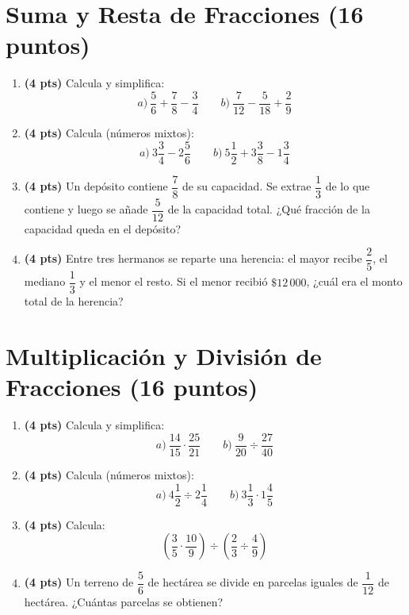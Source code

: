 \documentclass[12pt, letterpaper]{article}
\begin{document}
\newpage

\section{Suma y Resta de Fracciones (16 puntos)}

\begin{enumerate}[leftmargin=*]
  \item \textbf{(4 pts)} Calcula y simplifica:
        \[
          a)\ \frac{5}{6} + \frac{7}{8} - \frac{3}{4} \qquad b)\ \frac{7}{12} - \frac{5}{18} + \frac{2}{9}
        \]

  \item \textbf{(4 pts)} Calcula (números mixtos):
        \[
          a)\ 3\frac{3}{4} - 2\frac{5}{6} \qquad b)\ 5\frac{1}{2} + 3\frac{3}{8} - 1\frac{3}{4}
        \]

  \item \textbf{(4 pts)} Un depósito contiene $\dfrac{7}{8}$ de su capacidad. Se extrae $\dfrac{1}{3}$ de lo que contiene y luego se añade $\dfrac{5}{12}$ de la capacidad total. ¿Qué fracción de la capacidad queda en el depósito?

  \item \textbf{(4 pts)} Entre tres hermanos se reparte una herencia: el mayor recibe $\dfrac{2}{5}$, el mediano $\dfrac{1}{3}$ y el menor el resto. Si el menor recibió $\$12\,000$, ¿cuál era el monto total de la herencia?
\end{enumerate}

\newpage

\section{Multiplicación y División de Fracciones (16 puntos)}

\begin{enumerate}[leftmargin=*]
  \item \textbf{(4 pts)} Calcula y simplifica:
        \[
          a)\ \frac{14}{15} \cdot \frac{25}{21} \qquad b)\ \frac{9}{20} \div \frac{27}{40}
        \]

  \item \textbf{(4 pts)} Calcula (números mixtos):
        \[
          a)\ 4\frac{1}{2} \div 2\frac{1}{4} \qquad b)\ 3\frac{1}{3} \cdot 1\frac{4}{5}
        \]

  \item \textbf{(4 pts)} Calcula:
        \[
          \left(\frac{3}{5} \cdot \frac{10}{9}\right) \div \left(\frac{2}{3} \div \frac{4}{9}\right)
        \]

  \item \textbf{(4 pts)} Un terreno de $\dfrac{5}{6}$ de hectárea se divide en parcelas iguales de $\dfrac{1}{12}$ de hectárea. ¿Cuántas parcelas se obtienen?
\end{enumerate}
\end{document}

